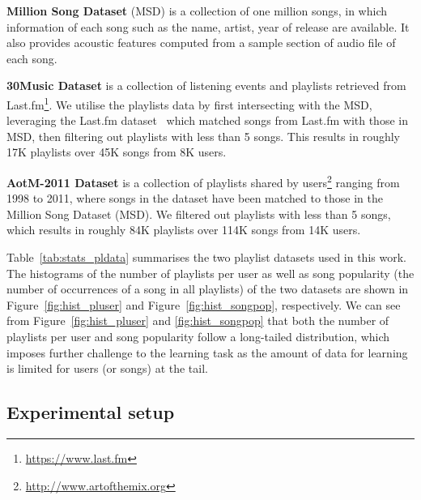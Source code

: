 {\bf Million Song Dataset} (MSD) is a collection of one million songs, in which information of each song such as the name, 
artist, year of release are available.
It also provides acoustic features computed from a sample section of audio file of each song. %

{\bf 30Music Dataset} is a collection of listening events and playlists retrieved from Last.fm\footnote{\url{https://www.last.fm}}.
We utilise the playlists data by first intersecting with the MSD, leveraging the Last.fm dataset~\cite{lastfmdataset}
which matched songs from Last.fm with those in MSD, then filtering out playlists with less than 5 songs.
This results in roughly 17K playlists over 45K songs from 8K users.

{\bf AotM-2011 Dataset} is a collection of playlists shared by users\footnote{\url{http://www.artofthemix.org}} ranging from 1998 to 2011,
where songs in the dataset have been matched to those in the Million Song Dataset (MSD).
We filtered out playlists with less than 5 songs, which results in roughly 84K playlists over 114K songs from 14K users.

Table~\ref{tab:stats_pldata} summarises the two playlist datasets used in this work.
The histograms of the number of playlists per user as well as song popularity 
(\ie the number of occurrences of a song in all playlists)
of the two datasets are shown in Figure~\ref{fig:hist_pluser} and Figure~\ref{fig:hist_songpop},
respectively.
We can see from Figure~\ref{fig:hist_pluser} and \ref{fig:hist_songpop} that both the number
of playlists per user and song popularity follow a long-tailed distribution, which imposes further challenge to the learning task as the amount
of data for learning is limited for users (or songs) at the tail.


\begin{table}[hbt]
\centering
\caption{Music playlist dataset}
\label{tab:stats_pldata}
\end{table}


\subsection{Experimental setup}

